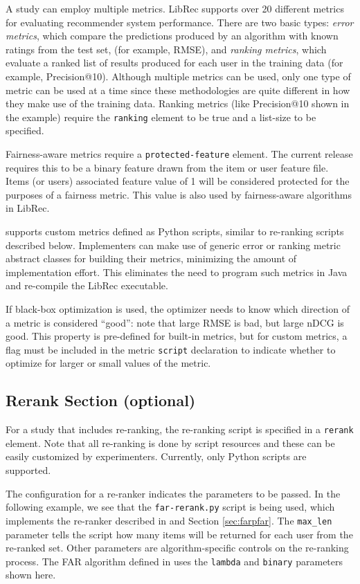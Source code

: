 A study can employ multiple metrics. LibRec supports over 20 different metrics for evaluating recommender system performance. There are two basic types: \textit{error metrics}, which compare the predictions produced by an algorithm with known ratings from the test set, (for example, RMSE), and \textit{ranking metrics}, which evaluate a ranked list of results produced for each user in the training data (for example, Precision@10). Although multiple metrics can be used, only one type of metric can be used at a time since these methodologies are quite different in how they make use of the training data. Ranking metrics (like Precision@10 shown in the example) require the \texttt{ranking} element to be true and a list-size to be specified.

Fairness-aware metrics require a \texttt{protected-feature} element. The current release requires this to be a binary feature drawn from the item or user feature file. Items (or users) associated feature value of 1 will be considered protected for the purposes of a fairness metric. This value is also used by fairness-aware algorithms in LibRec.

\libauto{} supports custom metrics defined as Python scripts, similar to re-ranking scripts described below. Implementers can make use of generic error or ranking metric abstract classes for building their metrics, minimizing the amount of implementation effort. This eliminates the need to program such metrics in Java and re-compile the LibRec executable.

If black-box optimization is used, the optimizer needs to know which direction of a metric is considered ``good'': note that large RMSE is bad, but large nDCG is good. This property is pre-defined for built-in metrics, but for custom metrics, a flag must be included in the metric \texttt{script} declaration to indicate whether to optimize for larger or small values of the metric.  

\subsection{Rerank Section (optional)}
\label{subsec:re-ra}
For a study that includes re-ranking, the re-ranking script is specified in a \texttt{rerank} element. Note that all re-ranking is done by script resources and these can be easily customized by experimenters. Currently, only Python scripts are supported.

The configuration for a re-ranker indicates the parameters to be passed. In the following example, we see that the \texttt{far-rerank.py} script is being used, which implements the re-ranker described in \cite{liu2019farpfar} and Section \ref{sec:farpfar}. The \texttt{max\_len} parameter tells the script how many items will be returned for each user from the re-ranked set. Other parameters are algorithm-specific controls on the re-ranking process. The FAR algorithm defined in \cite{liu2019farpfar} uses the \texttt{lambda} and \texttt{binary} parameters shown here.

